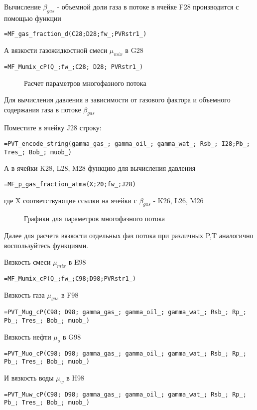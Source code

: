 Вычисление $\beta_{gas}$ - объемной доли газа в потоке в ячейке F28 производится с помощью функции

{ \small  \texttt{=MF\_gas\_fraction\_d(C28;D28;fw\_;PVRstr1\_)}}

А вязкости газожидкостной смеси $\mu_{mix}$ в G28

{ \small  \texttt{=MF\_Mumix\_cP(Q\_;fw\_;C28; D28; PVRstr1\_)}}

\begin{figure}[h!]
	\center{\texttt{[image: Ex30\_2]}}
	\caption{Расчет параметров многофазного потока}
	\label{ris:Ex30_2}
\end{figure}

Для вычисления давления в зависимости от газового фактора и объемного содержания газа в потоке $\beta_{gas}$

Поместите в ячейку J28 строку:

{ \small  \texttt{=PVT\_encode\_string(gamma\_gas\_; gamma\_oil\_; gamma\_wat\_; Rsb\_; I28;Pb\_; Tres\_; Bob\_; muob\_)}}

А в ячейки K28, L28, M28 функцию для вычисления давления 

{ \small  \texttt{=MF\_p\_gas\_fraction\_atma(X;20;fw\_;J28)}}

где X соответствующие ссылки на ячейки с $\beta_{gas}$ - K26, L26, M26

\begin{figure}[h!]
	\center{\texttt{[image: Ex30\_3]}}
	\caption{Графики для параметров многофазного потока}
	\label{ris:Ex30_3}
\end{figure}

Далее для расчета вязкости отдельных фаз потока при различных P,T аналогично воспользуйтесь функциями.

Вязкость смеси $\mu_{mix}$ в E98

{ \small  \texttt{=MF\_Mumix\_cP(Q\_;fw\_;C98;D98;PVRstr1\_)}}

Вязкость газа $\mu_{gas}$ в F98

{ \small  \texttt{=PVT\_Mug\_cP(C98; D98; gamma\_gas\_; gamma\_oil\_; gamma\_wat\_; Rsb\_; Rp\_; Pb\_; Tres\_; Bob\_; muob\_)}}

Вязкость нефти $\mu_{o}$ в G98

{ \small  \texttt{=PVT\_Muo\_cP(C98; D98; gamma\_gas\_; gamma\_oil\_; gamma\_wat\_; Rsb\_; Rp\_; Pb\_; Tres\_; Bob\_; muob\_)}}

И вязкость воды $\mu_{w}$ в H98

{ \small  \texttt{=PVT\_Muw\_cP(C98; D98; gamma\_gas\_; gamma\_oil\_; gamma\_wat\_; Rsb\_; Rp\_; Pb\_; Tres\_; Bob\_; muob\_)}}

